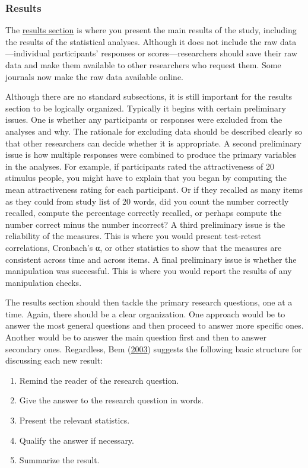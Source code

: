 \documentclass[
]{krantz}
\providecommand{\tightlist}{%
  \setlength{\itemsep}{0pt}\setlength{\parskip}{0pt}}
\begin{document}
\hypertarget{results}{%
\subsubsection*{Results}\label{results}}


The \protect\hyperlink{results-section}{results section} is where you present the main results of the study, including the results of the statistical analyses. Although it does not include the raw data---individual participants' responses or scores---researchers should save their raw data and make them available to other researchers who request them. Some journals now make the raw data available online.

Although there are no standard subsections, it is still important for the results section to be logically organized. Typically it begins with certain preliminary issues. One is whether any participants or responses were excluded from the analyses and why. The rationale for excluding data should be described clearly so that other researchers can decide whether it is appropriate. A second preliminary issue is how multiple responses were combined to produce the primary variables in the analyses. For example, if participants rated the attractiveness of 20 stimulus people, you might have to explain that you began by computing the mean attractiveness rating for each participant. Or if they recalled as many items as they could from study list of 20 words, did you count the number correctly recalled, compute the percentage correctly recalled, or perhaps compute the number correct minus the number incorrect? A third preliminary issue is the reliability of the measures. This is where you would present test-retest correlations, Cronbach's α, or other statistics to show that the measures are consistent across time and across items. A final preliminary issue is whether the manipulation was successful. This is where you would report the results of any manipulation checks.

The results section should then tackle the primary research questions, one at a time. Again, there should be a clear organization. One approach would be to answer the most general questions and then proceed to answer more specific ones. Another would be to answer the main question first and then to answer secondary ones. Regardless, Bem (\protect\hyperlink{ref-bem2003writing}{2003}) suggests the following basic structure for discussing each new result:

\begin{enumerate}
\def\labelenumi{\arabic{enumi}.}
\tightlist
\item
  Remind the reader of the research question.
\item
  Give the answer to the research question in words.
\item
  Present the relevant statistics.
\item
  Qualify the answer if necessary.
\item
  Summarize the result.
\end{enumerate}
\end{document}
